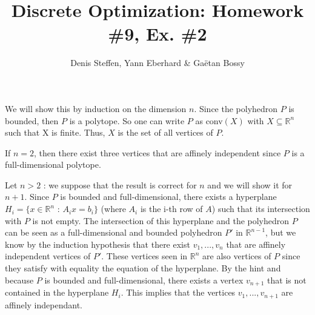 \documentclass[a4paper,11pt,french]{article}
\title{Discrete Optimization: Homework \#9, Ex. \#2}
\author{Denis Steffen, Yann Eberhard \& Gaëtan Bossy}
\begin{document}
    
    \maketitle
    
    We will show this by induction on the dimension $n$. Since the polyhedron $P$ is bounded, then $P$ is a polytope. So one can write $P$ as conv$(X)$ with $X \subseteq \mathbb{R}^n$ such that X is finite.
    Thus, $X$ is the set of all vertices of $P$.

    If $n=2$, then there exist three vertices that are affinely independent since $P$ is a full-dimensional polytope. 

    Let $n > 2$ : we suppose that the result is correct for $n$ and we will show it for $n+1$.  Since $P$ is bounded and full-dimensional, there exists a hyperplane $H_{i}=\{x \in \mathbb{R}^n$ : $A_i x=b_i \}$ (where $A_i$ is the i-th row of $A$) such that its intersection with $P$ is not empty. 
    The intersection of this hyperplane and the polyhedron $P$ can be seen as a full-dimensional and bounded polyhedron $P'$ in $\mathbb{R}^{n-1}$, but we know by the induction hypothesis that there exist $v_1,...,v_n$ that are affinely independent vertices of $P'$. 
    These vertices seen in $\mathbb{R}^n$ are also vertices of $P$ since they satisfy with equality the equation of the hyperplane. By the hint and because $P$ is bounded and full-dimensional, there exists a vertex $v_{n+1}$ that is not contained in the hyperplane $H_i$. This implies that the vertices $v_1,...,v_{n+1}$ are affinely independant.

  
\end{document}
